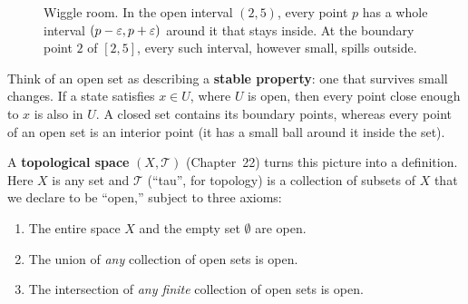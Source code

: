\begin{figure}[htbp]
\caption{Wiggle room. In the open interval $(2, 5)$, every point $p$ has a whole interval $(p-\varepsilon, p+\varepsilon)$ around it that stays inside. At the boundary point $2$ of $[2, 5]$, every such interval, however small, spills outside.}\label{37:fig-wiggle-room}
\end{figure}

\begin{intuitionbox}
Think of an open set as describing a \textbf{stable property}: one that survives small changes. If a state satisfies $x \in U$, where $U$ is open, then every point close enough to $x$ is also in $U$. A closed set contains its boundary points, whereas every point of an open set is an interior point (it has a small ball around it inside the set).
\end{intuitionbox}

A \textbf{topological space} $(X, \mathcal{T})$ (Chapter~22) turns this picture into a definition. Here $X$ is any set and $\mathcal{T}$ (``tau'', for topology) is a collection of subsets of $X$ that we declare to be ``open,'' subject to three axioms:
\begin{enumerate}
  \item The entire space $X$ and the empty set $\emptyset$ are open.
  \item The union of \emph{any} collection of open sets is open.
  \item The intersection of \emph{any finite} collection of open sets is open.
\end{enumerate}

